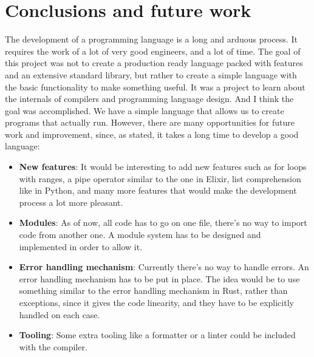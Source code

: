 ﻿\documentclass[10pt,a4paper,twocolumn,twoside]{article}
\begin{document}
\section{Conclusions and future work}
The development of a programming language is a long and arduous process. It
requires the work of a lot of very good engineers, and a lot of time. The goal
of this project was not to create a production ready language packed with
features and an extensive standard library, but rather to create a simple
language with the basic functionality to make something useful. It was a project
to learn about the internals of compilers and programming language design. And I
think the goal was accomplished. We have a simple language that allows us to
create programs that actually run. However, there are many opportunities for
future work and improvement, since, as stated, it takes a long time to develop a
good language:

\begin{itemize}
    \item \textbf{New features}: It would be interesting to add new features
        such as for loops with ranges, a pipe operator similar to the one in
        Elixir, list comprehension like in Python, and many more features that
        would make the development process a lot more pleasant.
    \item \textbf{Modules}: As of now, all code has to go on one file, there's
        no way to import code from another one. A module system has to be 
        designed and implemented in order to allow it.
    \item \textbf{Error handling mechanism}: Currently there's no way to handle
        errors. An error handling mechanism has to be put in place. The idea
        would be to use something similar to the error handling mechanism in 
        Rust, rather than exceptions, since it gives the code linearity, and 
        they have to be explicitly handled on each case.
    \item \textbf{Tooling}: Some extra tooling like a formatter or a linter
        could be included with the compiler.
\end{itemize}
\end{document}
